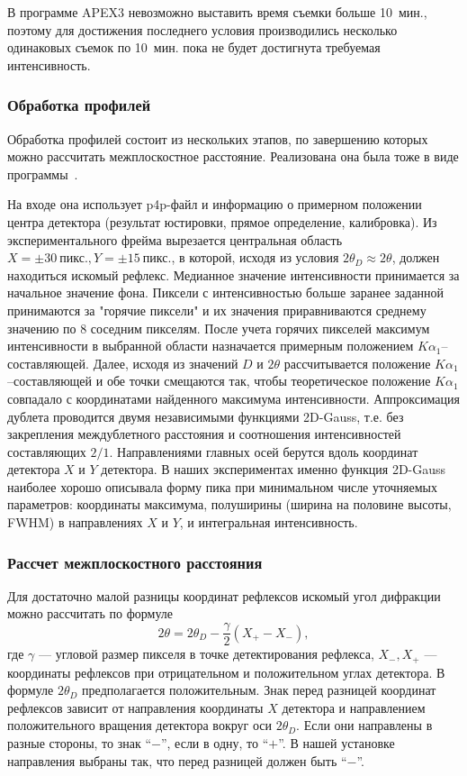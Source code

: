 \documentclass[a4paper,14pt]{extarticle}
\newcommand{\unit}[1]{ \ \text{#1}}
\begin{document}
В программе APEX3 невозможно выставить время съемки больше 10~мин., поэтому для достижения последнего условия производились несколько одинаковых съемок по 10~мин. пока не будет достигнута требуемая интенсивность.
\subsubsection{Обработка профилей}
Обработка профилей состоит из нескольких этапов, по завершению которых можно рассчитать межплоскостное расстояние.
Реализована она была тоже в виде программы~\cite{Kudryavtsev:2024:eccentr}.

На входе она использует p4p-файл и информацию о примерном положении центра детектора (результат юстировки, прямое определение, калибровка).
Из экспериментального фрейма вырезается центральная область $X = \pm 30\unit{пикс.}, Y = \pm 15\unit{пикс.}$, в которой, исходя из условия $2\theta_D \approx 2\theta$, должен находиться искомый рефлекс.
Медианное значение интенсивности принимается за начальное значение фона.
Пиксели с интенсивностью больше заранее заданной принимаются за "горячие пиксели" и их значения приравниваются среднему значению по 8 соседним пикселям.
После учета горячих пикселей максимум интенсивности в выбранной области назначается примерным положением $K\alpha_1$--составляющей.
Далее, исходя из значений $D$ и $2\theta$ рассчитывается положение $K\alpha_1$--составляющей и обе точки смещаются так, чтобы теоретическое положение $K\alpha_1$ совпадало с координатами найденного максимума интенсивности.
Аппроксимация дублета проводится двумя независимыми  функциями 2D-Gauss, т.е. без закрепления междублетного расстояния и соотношения интенсивностей составляющих $2/1$.
Направлениями главных осей берутся вдоль координат детектора $X$ и $Y$ детектора.
В наших экспериментах именно функция 2D-Gauss наиболее хорошо описывала форму пика при минимальном числе уточняемых параметров: координаты максимума, полуширины (ширина на половине высоты, FWHM) в направлениях $X$ и $Y$, и интегральная интенсивность.
\subsubsection{Рассчет межплоскостного расстояния}
Для достаточно малой разницы координат рефлексов искомый угол дифракции можно рассчитать по формуле
\begin{equation} \label{eq:bond2}
    2\theta = 2\theta_D - \frac{\gamma}{2} (X_{+} - X_{-}),
\end{equation}
где $\gamma$ --- угловой размер пикселя в точке детектирования рефлекса, $X_{-}, X_{+}$ --- координаты рефлексов при отрицательном и положительном углах детектора.
В формуле $2\theta_D$ предполагается положительным.
Знак перед разницей координат рефлексов зависит от направления координаты $X$ детектора и направлением положительного вращения детектора вокруг оси $2\theta_D$.
Если они направлены в разные стороны, то знак ``$-$'', если в одну, то ``$+$''.
В нашей установке направления выбраны так, что перед разницей должен быть ``$-$''.
\end{document}
